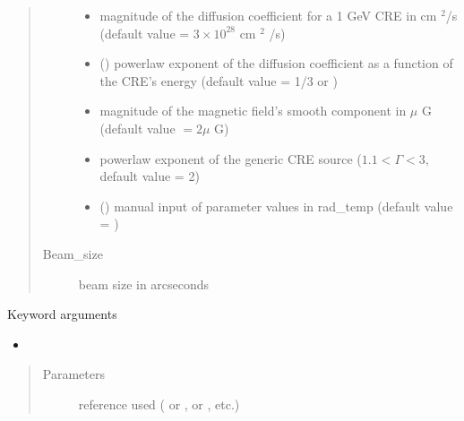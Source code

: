 \documentclass[letterpaper,10pt,english]{sphinxmanual}
\begin{document}
\begin{fulllineitems}
\begin{quote}
\begin{description}
\begin{itemize}
\item {} 
\sphinxAtStartPar
{} \textendash{} magnitude of the diffusion coefficient for a 1 GeV CRE in cm \({}^2\)/s (default value = \(3\times 10^{28}\) cm \({}^2\) /s)

\item {} 
\sphinxAtStartPar
{} (\sphinxstyleliteralemphasis{\sphinxupquote{, }}) \textendash{} power\sphinxhyphen{}law exponent of the diffusion coefficient as a function of the CRE’s energy (default value = 1/3 or )

\item {} 
\sphinxAtStartPar
{} \textendash{} magnitude of the magnetic field’s smooth component in \(\mu\) G (default value \(= 2 \mu\) G)

\item {} 
\sphinxAtStartPar
{} \textendash{} power\sphinxhyphen{}law exponent of the generic CRE source (\(1.1 < \Gamma < 3\), default value = 2)

\item {} 
\sphinxAtStartPar
{} () \textendash{} manual input of parameter values in rad\_temp (default value = )

\end{itemize}

\item[{Beam\_size}] \leavevmode
\sphinxAtStartPar
beam size in arcseconds

\end{description}\end{quote}

\sphinxAtStartPar
Keyword arguments
\begin{itemize}
\item {} 
\sphinxAtStartPar
{}

\end{itemize}
\begin{quote}\begin{description}
\item[{Parameters}] \leavevmode
\sphinxAtStartPar
{} \textendash{} reference used ( or \sphinxcode{\sphinxupquote{\textquotesingle{}1309.2641\textquotesingle{}}},  or \sphinxcode{\sphinxupquote{\textquotesingle{}1408.0002\textquotesingle{}}}, etc.)


\end{description}
\end{quote}
\end{fulllineitems}
\end{document}
